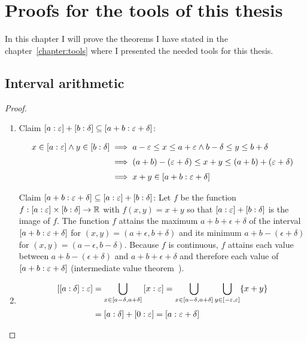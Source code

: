 \chapter{Proofs for the tools of this thesis}

In this chapter I will prove the theorems I have stated in the chapter~\ref{chapter:tools} where I presented the needed tools for this thesis.

\section{Interval arithmetic}



\begin{proof} ~
  \begin{enumerate}
    \item Claim $\an[\epsilon]{a} + \an[\delta]{b} \subseteq \an[\epsilon+\delta]{a+b}$:

      \begin{align}
        x \in \an[\epsilon]{a} \land y \in \an[\delta]{b} & \implies a-\epsilon \le x \le a+\epsilon \land b-\delta \le y \le b+\delta \nl
        & \implies (a+b)-(\epsilon + \delta) \le x+y \le (a+b)+(\epsilon + \delta) \nl
        & \implies x+y \in \an[\epsilon+\delta]{a+b}
      \end{align}

      Claim $\an[\epsilon+\delta]{a+b} \subseteq \an[\epsilon]{a} + \an[\delta]{b}$: Let $f$ be the function $f: \an[\epsilon]{a} \times \an[\delta]{b} \to \R$ with $f(x,y) =x+y$ so that $\an[\epsilon]{a} + \an[\delta]{b}$ is the image of $f$. The function $f$ attains the maximum $a+b+\epsilon+\delta$ of the interval $\an[\epsilon+\delta]{a+b}$ for $(x,y) = \left(a+\epsilon,b+\delta\right)$ and its minimum $a+b-(\epsilon+\delta)$ for $(x,y)=\left(a-\epsilon,b-\delta\right)$. Because $f$ is continuous, $f$ attains each value between $a+b-(\epsilon+\delta)$ and $a+b+\epsilon+\delta$ and therefore each value of $\an[\epsilon+\delta]{a+b}$ (intermediate value theorem~\cite{wiki:intermediatevaluetheorem}).
    \item

      \begin{align}
        \an[\epsilon]{\an[\delta]{a}} & = \bigcup_{x\in \interval{a-\delta}{a+\delta}} \an[\epsilon]{x} = \bigcup_{x\in\interval{a-\delta}{a+\delta}} \bigcup_{y\in\interval{-\epsilon}{\epsilon}} \{x+y\} \nl
        &= \an[\delta]{a} + \an[\epsilon]{0} = \an[\epsilon+\delta]{a}
      \end{align}
 

\end{enumerate}
\end{proof}
